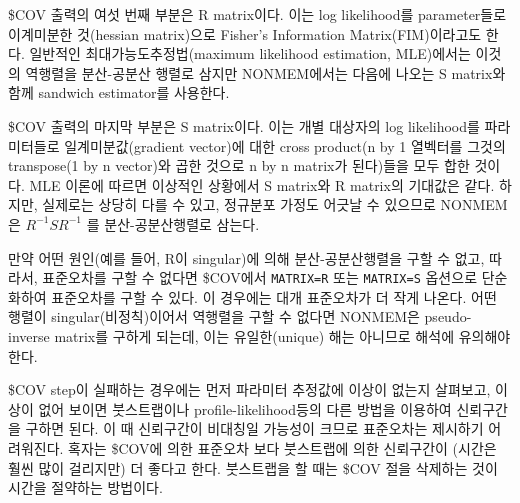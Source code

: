 \documentclass[
  11pt,
  krantz2, a4paper, twoside]{krantz}
\theoremstyle{definition}
\theoremstyle{definition}
\theoremstyle{definition}
\theoremstyle{remark}
\begin{document}
\$COV 출력의 여섯 번째 부분은 R matrix이다. 이는 log likelihood를 parameter들로 이계미분한 것(hessian matrix)으로 Fisher's Information Matrix(FIM)이라고도 한다. 일반적인 최대가능도추정법(maximum likelihood estimation, MLE)에서는 이것의 역행렬을 분산-공분산 행렬로 삼지만 NONMEM에서는 다음에 나오는 S matrix와 함께 sandwich estimator를 사용한다.

\$COV 출력의 마지막 부분은 S matrix이다. 이는 개별 대상자의 log likelihood를 파라미터들로 일계미분값(gradient vector)에 대한 cross product(n by 1 열벡터를 그것의 transpose(1 by n vector)와 곱한 것으로 n by n matrix가 된다)들을 모두 합한 것이다. MLE 이론에 따르면 이상적인 상황에서 S matrix와 R matrix의 기대값은 같다. 하지만, 실제로는 상당히 다를 수 있고, 정규분포 가정도 어긋날 수 있으므로 NONMEM은 \(R^{- 1}SR^{- 1}\) 를 분산-공분산행렬로 삼는다.

만약 어떤 원인(예를 들어, R이 singular)에 의해 분산-공분산행렬을 구할 수 없고, 따라서, 표준오차를 구할 수 없다면 \$COV에서 \texttt{MATRIX=R} 또는 \texttt{MATRIX=S} 옵션으로 단순화하여 표준오차를 구할 수 있다. 이 경우에는 대개 표준오차가 더 작게 나온다. 어떤 행렬이 singular(비정칙)이어서 역행렬을 구할 수 없다면 NONMEM은 pseudo-inverse matrix를 구하게 되는데, 이는 유일한(unique) 해는 아니므로 해석에 유의해야 한다.

\$COV step이 실패하는 경우에는 먼저 파라미터 추정값에 이상이 없는지 살펴보고, 이상이 없어 보이면 붓스트랩이나 profile-likelihood등의 다른 방법을 이용하여 신뢰구간을 구하면 된다. 이 때 신뢰구간이 비대칭일 가능성이 크므로 표준오차는 제시하기 어려워진다. 혹자는 \$COV에 의한 표준오차 보다 붓스트랩에 의한 신뢰구간이 (시간은 훨씬 많이 걸리지만) 더 좋다고 한다. 붓스트랩을 할 때는 \$COV 절을 삭제하는 것이 시간을 절약하는 방법이다.
\end{document}
